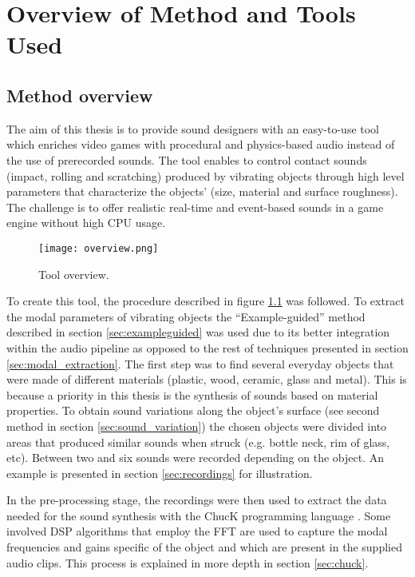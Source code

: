 \chapter{Overview of Method and Tools Used}\label{ch:method}

\section{Method overview}
The aim of this thesis is to provide sound designers with an easy-to-use tool which enriches video games with procedural and physics-based audio instead of the use of prerecorded sounds. The tool enables to control contact sounds (impact, rolling and scratching) produced by vibrating objects through high level parameters that characterize the objects' (size, material and surface roughness). The challenge is to offer realistic real-time and event-based sounds in a game engine without high \gls{CPU} usage.

\begin{figure}[H]
  \centering
    \texttt{[image: overview.png]}
      \caption{Tool overview.}
      \label{fig:synth_proc}
\end{figure}

To create this tool, the procedure described in figure \ref{fig:synth_proc} was followed. To extract the modal parameters of vibrating objects the ``Example-guided'' method described in section \ref{sec:exampleguided} was used due to its better integration within the audio pipeline as opposed to the rest of techniques presented in section \ref{sec:modal_extraction}. The first step was to find several everyday objects that were made of different materials (plastic, wood, ceramic, glass and metal). This is because a priority in this thesis is the synthesis of sounds based on material properties. To obtain sound variations along the object's surface (see second method in section \ref{sec:sound_variation}) the chosen objects were divided into areas that produced similar sounds when struck (e.g. bottle neck, rim of glass, etc). Between two and six sounds were recorded depending on the object. An example is presented in section \ref{sec:recordings} for illustration.

In the pre-processing stage, the recordings were then used to extract the data needed for the sound synthesis with the ChucK programming language \cite{bib:chuck}. Some involved \gls{DSP} algorithms that employ the \gls{FFT} are used to capture the modal frequencies and gains specific of the object and which are present in the supplied audio clips. This process is explained in more depth in section \ref{sec:chuck}. 


